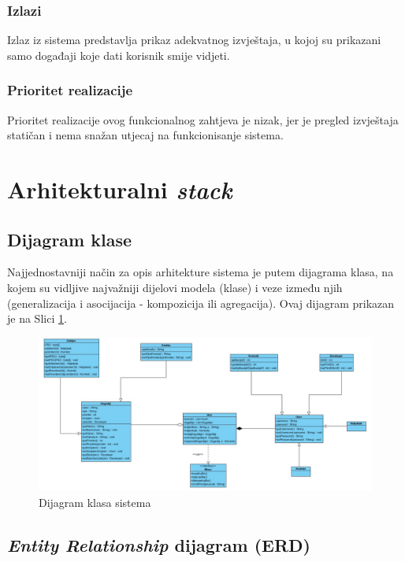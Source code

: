\documentclass[12pt,a4paper]{article}
\begin{document}
\subsubsection{Izlazi}

Izlaz iz sistema predstavlja prikaz adekvatnog izvještaja, u kojoj su prikazani samo događaji koje dati korisnik smije vidjeti.

\subsubsection{Prioritet realizacije}

Prioritet realizacije ovog funkcionalnog zahtjeva je nizak, jer je pregled izvještaja statičan i nema snažan utjecaj na funkcionisanje sistema.

\newpage

\section{Arhitekturalni \textit{stack}}

\subsection{Dijagram klase}

Najjednostavniji način za opis arhitekture sistema je putem dijagrama klasa, na kojem su vidljive najvažniji dijelovi modela (klase) i veze između njih (generalizacija i asocijacija - kompozicija ili agregacija). Ovaj dijagram prikazan je na Slici \ref{class}.

\begin{figure}[H]
\center
\includegraphics[scale=0.45]{../res/class.JPG}
\caption{Dijagram klasa sistema}
\label{class}
\end{figure}

\subsection{\textit{Entity Relationship} dijagram (ERD)}
\end{document}
